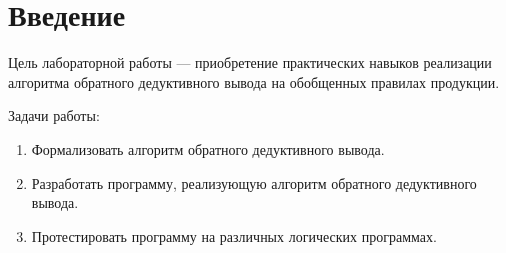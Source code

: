 \chapter*{Введение}

Цель лабораторной работы --- приобретение практических навыков реализации алгоритма обратного дедуктивного вывода на обобщенных правилах продукции.

Задачи работы:
\begin{enumerate}
    \item Формализовать алгоритм обратного дедуктивного вывода.
    \item Разработать программу, реализующую алгоритм обратного дедуктивного вывода.
    \item Протестировать программу на различных логических программах.
\end{enumerate}
